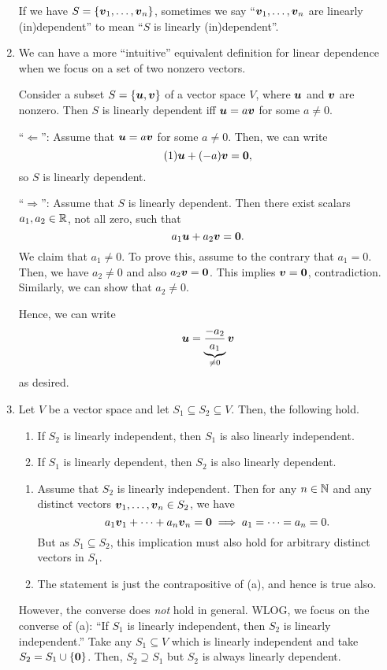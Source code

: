 \begin{enumerate}
\begin{note}
If we have \(S=\{\vb*{v}_1,\dotsc,\vb*{v}_n\}\), sometimes we say
``\(\vb*{v}_1,\dotsc,\vb*{v}_n\) are linearly (in)dependent'' to mean
``\(S\) is linearly (in)dependent''.
\end{note}

\item \label{it:two-nonzero-vec-lin-dep}
We can have a more ``intuitive'' equivalent definition for linear
dependence when we focus on a set of two nonzero vectors.

Consider a subset \(S=\{\vb*{u},\vb*{v}\}\) of a vector space \(V\), where
\(\vb*{u}\) and \(\vb*{v}\) are nonzero. Then \(S\) is linearly dependent iff
\(\vb*{u}=a\vb*{v}\) for some \(a\ne 0\).

\begin{pf}
``\(\Leftarrow\)'': Assume that \(\vb*{u}=a\vb*{v}\) for some \(a\ne 0\).
Then, we can write
\[
(1)\vb*{u}+(-a)\vb*{v}=\vb*{0},
\]
so \(S\) is linearly dependent.

``\(\Rightarrow\)'': Assume that \(S\) is linearly dependent. Then there exist
scalars \(a_1,a_2\in\mathbb{R}\), not all zero, such that
\[
a_1\vb*{u}+a_2\vb*{v}=\vb*{0}.
\]
We claim that \(a_1\ne 0\). To prove this, assume to the contrary that
\(a_1=0\). Then, we have \(a_2\ne 0\) and also \(a_2\vb*{v}=\vb*{0}\). This
implies \(\vb*{v}=\vb*{0}\), contradiction. Similarly, we can show that
\(a_2\ne 0\).

Hence, we can write
\[
\vb*{u}=\underbrace{\frac{-a_2}{a_1}}_{\ne 0}\vb*{v}
\]
as desired.
\end{pf}
\item \label{it:lin-dep-subsets}
Let \(V\) be a vector space and let \(S_1\subseteq S_2\subseteq V\). Then, the
following hold.
\begin{enumerate}
\item If \(S_2\) is linearly independent, then \(S_1\) is also linearly independent.
\item If \(S_1\) is linearly dependent, then \(S_2\) is also linearly
dependent.
\end{enumerate}
\begin{pf}
\begin{enumerate}
\item Assume that \(S_2\) is linearly independent. Then for any \(n\in\mathbb{N}\) and
any distinct vectors \(\vb*{v}_1,\dotsc,\vb*{v}_n\in S_2\), we have
\[
a_1\vb*{v}_1+\dotsb+a_n\vb*{v}_n=\vb*{0}
\implies a_1=\dotsb=a_n=0.
\]
But as \(S_1\subseteq S_2\), this implication must also hold for arbitrary
distinct vectors in \(S_1\).

\item The statement is just the contrapositive of (a), and hence is true also.
\end{enumerate}
\end{pf}

However, the converse does \emph{not} hold in general. WLOG, we focus on the
converse of (a): ``If \(S_1\) is linearly independent, then \(S_2\) is linearly
independent.'' Take any \(S_1\subseteq V\) which is linearly independent and
take \(S_2=S_1\cup\{\vb*{0}\}\).  Then, \(S_2\supseteq S_1\) but \(S_2\) is
always linearly dependent.
\end{enumerate}
